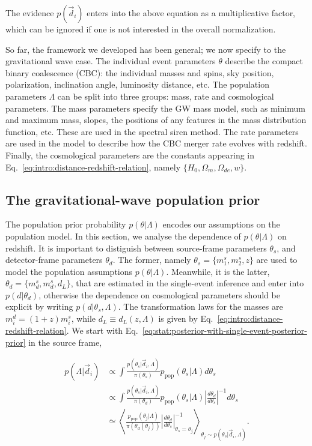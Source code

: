 \documentclass[%
preprint,
nofootinbib,
 amsmath,amssymb,
 aps,
]{revtex4-2}
\newcommand{\given}[2]{p( #1 | #2 )}
\newcommand{\ppop}[0]{p_{\text{pop}}}
\begin{document}
The evidence $p(\vec{d}_i)$ enters into the above equation as a multiplicative factor, which can be
ignored if one is not interested in the overall normalization.

So far, the framework we developed has been general; we now specify to the gravitational wave case.
The individual event parameters $\theta$ describe the compact binary coalescence (CBC): the
individual masses and spins, sky position, polarization, inclination angle, luminosity distance,
etc. The population parameters $\Lambda$ can be split into three groups: mass, rate and
cosmological parameters. The mass parameters specify the GW mass model, such as minimum and maximum
mass, slopes, the positions of any features in the mass distribution function, etc. These are used
in the spectral siren method. The rate parameters are used in the model to describe how the CBC
merger rate evolves with redshift. Finally, the cosmological parameters are the constants appearing
in Eq.~\eqref{eq:intro:distance-redshift-relation}, namely $\{H_0, \Omega_m, \Omega_{de}, w\}$.

\subsection{The gravitational-wave population prior}
\label{sec:population-prior}

The population prior probability $\given{\theta}{\Lambda}$ encodes our assumptions on the
population model. In this section, we analyse the dependence of $\given{\theta}{\Lambda}$ on
redshift. It is important to distiguish between source-frame parameters $\theta_s$, and
detector-frame parameters $\theta_d$. The former, namely $\theta_s = \{m^s_1, m^s_2, z\}$ are used
to model the population assumptions $\given{\theta}{\Lambda}$. Meanwhile, it is the latter,
$\theta_d = \{m^s_d, m^s_d, d_L\}$, that are estimated in the single-event inference and enter into
$\given{d}{\theta_d}$, otherwise the dependence on cosmological parameters should be explicit by
writing $\given{d}{\theta_s, \Lambda}$. The transformation laws for the masses are $m_i^d = (1 + z)
	m_i^s$, while $d_L \equiv d_L(z, \Lambda)$ is given by
Eq.~\eqref{eq:intro:distance-redshift-relation}. We start with
Eq.~\eqref{eq:stat:posterior-with-single-event-posterior-prior} in the source frame,

\begin{align}
	\given{\Lambda}{\vec{d}_i} & \propto \int \frac{\given{\theta_s}{\vec{d}_i, \Lambda}}{\pi(\theta_s)} \ppop(\theta_s | \Lambda ) d\theta_s                                                                                                                \\
	                           & \propto \int \frac{\given{\theta_s}{\vec{d}_i, \Lambda}}{\pi(\theta_d)} \ppop(\theta_s | \Lambda ) \left | \frac{d\theta_d}{d\theta_s} \right |^{-1} d\theta_s                                                              \\
	                           & \simeq \left \langle \frac{\ppop(\theta_j | \Lambda )}{\pi(\theta_d (\theta_j))} \left | \frac{d\theta_d}{d\theta_s} \right |^{-1}_{\theta_s=\theta_j} \right \rangle_{\theta_j \sim \given{\theta_s}{\vec{d}_i, \Lambda}}.
\end{align}
\end{document}
